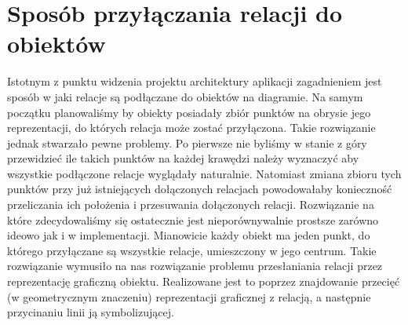 \section{Sposób przyłączania relacji do obiektów}
Istotnym z punktu widzenia projektu architektury aplikacji zagadnieniem jest sposób w jaki relacje są podłączane do obiektów na diagramie. Na samym początku planowaliśmy by obiekty posiadały zbiór punktów na obrysie jego reprezentacji, do których relacja może zostać przyłączona. Takie rozwiązanie jednak stwarzało pewne problemy. Po pierwsze nie byliśmy w stanie z góry przewidzieć ile takich punktów na każdej krawędzi należy wyznaczyć aby wszystkie podłączone relacje wyglądały naturalnie. Natomiast zmiana zbioru tych punktów przy już istniejących dołączonych relacjach powodowałaby konieczność przeliczania ich położenia i przesuwania dołączonych relacji.
Rozwiązanie na które zdecydowaliśmy się ostatecznie jest nieporównywalnie prostsze zarówno ideowo jak i w implementacji. Mianowicie każdy obiekt ma jeden punkt, do którego przyłączane są wszystkie relacje, umieszczony w jego centrum. Takie rozwiązanie wymusiło na nas rozwiązanie problemu przesłaniania relacji przez reprezentację graficzną obiektu. Realizowane jest to poprzez znajdowanie przecięć (w geometrycznym znaczeniu) reprezentacji graficznej z relacją, a następnie przycinaniu linii ją symbolizującej.

